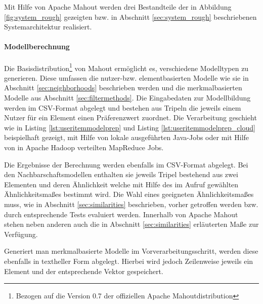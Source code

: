 
Mit Hilfe von Apache Mahout werden drei  Bestandteile der in Abbildung \ref{fig:system_rough} gezeigten bzw. in Abschnitt \ref{sec:system_rough} beschriebenen Systemarchitektur realisiert.

\paragraph{Modellberechnung} Die Basisdistribution\footnote{Bezogen auf die Version 0.7 der offiziellen Apache Mahoutdistribution} von Mahout ermöglicht es, verschiedene Modelltypen zu generieren. Diese umfassen die nutzer-bzw. elementbasierten Modelle wie sie in Abschnitt \ref{sec:neighborhoods} beschrieben werden und die merkmalbasierten Modelle aus Abschnitt \ref{sec:filtermethods}. Die Eingabedaten zur Modellbildung werden im CSV-Format abgelegt und bestehen aus Tripeln die jeweils einem Nutzer für ein Element einen Präferenzwert zuordnet. Die Verarbeitung geschieht wie in Listing \ref{lst:useritemmodelprep} und Listing \ref{lst:useritemmodelprep_cloud} beispielhaft gezeigt, mit Hilfe von lokale ausgeführten Java-Jobs oder mit Hilfe von in Apache Hadoop verteilten MapReduce Jobs.

 
 

Die Ergebnisse der Berechnung werden ebenfalls im CSV-Format abgelegt. Bei den Nachbarschaftsmodellen enthalten sie jeweils Tripel bestehend aus zwei Elementen und deren Ähnlichkeit welche mit Hilfe des im Aufruf gewählten Ähnlichkeitsmaßes bestimmt wird. Die Wahl eines geeigneten Ähnlichkeitsmaßes muss, wie in Abschnitt \ref{sec:similarities} beschrieben, vorher getroffen werden bzw. durch entsprechende Tests evaluiert werden. Innerhalb von Apache Mahout stehen neben anderen auch die in Abschnitt \ref{sec:similarities} erläuterten Maße zur Verfügung.

Generiert man merkmalbasierte Modelle im Vorverarbeitungsschritt, werden diese ebenfalls in textheller Form abgelegt. Hierbei wird jedoch Zeilenweise jeweils ein Element und der entsprechende Vektor gespeichert.

